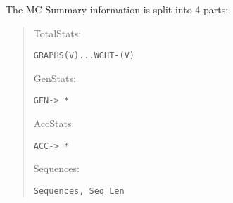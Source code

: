 \documentclass[openany,a4paper,10pt]{manual}
\begin{document}
The MC Summary information is split into 4 parts:
\begin{quote}

TotalStats:

\begin{Verbatim}[commandchars=@\[\]]
GRAPHS(V)...WGHT-(V)
\end{Verbatim}

GenStats:

\begin{Verbatim}[commandchars=@\[\]]
GEN-> *
\end{Verbatim}

AccStats:

\begin{Verbatim}[commandchars=@\[\]]
ACC-> *
\end{Verbatim}

Sequences:

\begin{Verbatim}[commandchars=@\[\]]
Sequences, Seq Len
\end{Verbatim}
\end{quote}
\end{document}
